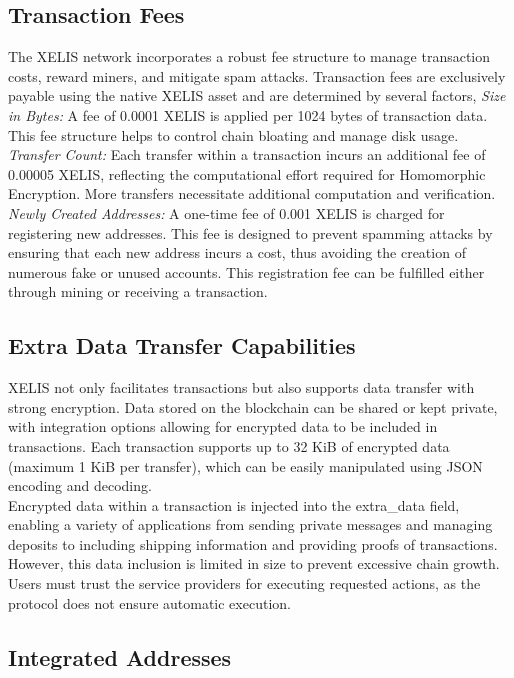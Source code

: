 \documentclass[10pt,a4paper,twocolumn]{article}
\begin{document}
\subsection{Transaction Fees}

The XELIS network incorporates a robust fee structure to manage transaction costs, reward miners, and mitigate spam attacks. Transaction fees are exclusively payable using the native XELIS asset and are determined by several factors, \textit{Size in Bytes:} A fee of 0.0001 XELIS is applied per 1024 bytes of transaction data. This fee structure helps to control chain bloating and manage disk usage.
\textit{Transfer Count: }Each transfer within a transaction incurs an additional fee of 0.00005 XELIS, reflecting the computational effort required for Homomorphic Encryption. More transfers necessitate additional computation and verification. \textit{Newly Created Addresses:} A one-time fee of 0.001 XELIS is charged for registering new addresses. This fee is designed to prevent spamming attacks by ensuring that each new address incurs a cost, thus avoiding the creation of numerous fake or unused accounts. This registration fee can be fulfilled either through mining or receiving a transaction.\\

\subsection{Extra Data Transfer Capabilities}

XELIS not only facilitates transactions but also supports data transfer with strong encryption. Data stored on the blockchain can be shared or kept private, with integration options allowing for encrypted data to be included in transactions. Each transaction supports up to 32 KiB of encrypted data (maximum 1 KiB per transfer), which can be easily manipulated using JSON encoding and decoding.\\

Encrypted data within a transaction is injected into the extra\_data field, enabling a variety of applications from sending private messages and managing deposits to including shipping information and providing proofs of transactions. However, this data inclusion is limited in size to prevent excessive chain growth. Users must trust the service providers for executing requested actions, as the protocol does not ensure automatic execution.\\

\subsection{Integrated Addresses}
\end{document}
